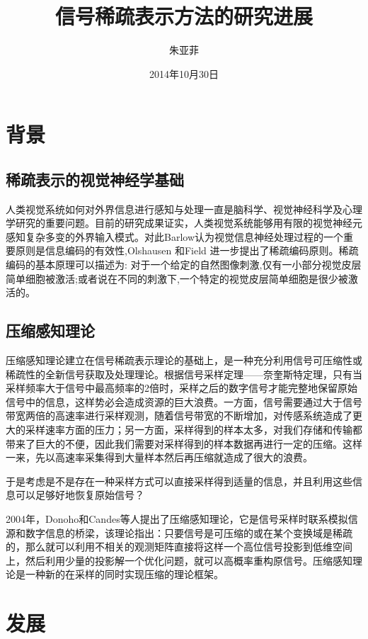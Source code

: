\documentclass[a4paper,12pt]{article}
\title{信号稀疏表示方法的研究进展}
\author{朱亚菲}
\date{2014年10月30日}
\begin{document}
\maketitle

\section{背景}

\subsection{稀疏表示的视觉神经学基础}

人类视觉系统如何对外界信息进行感知与处理一直是脑科学、视觉神经科学及心理学研究的重要问题。目前的研究成果证实，人类视觉系统能够用有限的视觉神经元感知复杂多变的外界输入模式。对此Barlow认为视觉信息神经处理过程的一个重要原则是信息编码的有效性,Olshausen 和Field 进一步提出了稀疏编码原则。稀疏编码的基本原理可以描述为: 对于一个给定的自然图像刺激,仅有一小部分视觉皮层简单细胞被激活;或者说在不同的刺激下,一个特定的视觉皮层简单细胞是很少被激活的。

\subsection{压缩感知理论}
压缩感知理论建立在信号稀疏表示理论的基础上，是一种充分利用信号可压缩性或稀疏性的全新信号获取及处理理论。根据信号采样定理——奈奎斯特定理，只有当采样频率大于信号中最高频率的2倍时，采样之后的数字信号才能完整地保留原始信号中的信息，这样势必会造成资源的巨大浪费。一方面，信号需要通过大于信号带宽两倍的高速率进行采样观测，随着信号带宽的不断增加，对传感系统造成了更大的采样速率方面的压力；另一方面，采样得到的样本太多，对我们存储和传输都带来了巨大的不便，因此我们需要对采样得到的样本数据再进行一定的压缩。这样一来，先以高速率采集得到大量样本然后再压缩就造成了很大的浪费。

于是考虑是不是存在一种采样方式可以直接采样得到适量的信息，并且利用这些信息可以足够好地恢复原始信号？

2004年，Donoho和Candes等人提出了压缩感知理论，它是信号采样时联系模拟信源和数字信息的桥梁，该理论指出：只要信号是可压缩的或在某个变换域是稀疏的，那么就可以利用不相关的观测矩阵直接将这样一个高位信号投影到低维空间上，然后利用少量的投影解一个优化问题，就可以高概率重构原信号。压缩感知理论是一种新的在采样的同时实现压缩的理论框架。

\section{发展}
\end{document}
